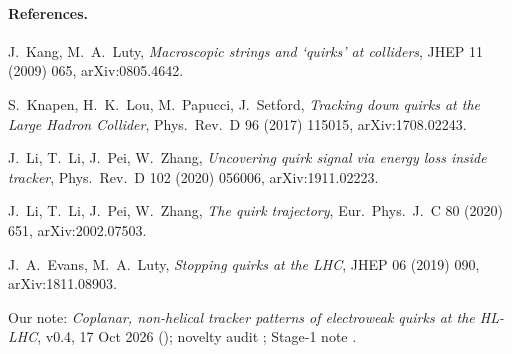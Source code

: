 \documentclass[11pt]{article}
\begin{document}
\paragraph{References.}
{\small
\begin{enumerate}[label={[\arabic*]},leftmargin=*]
\item J.~Kang, M.~A.~Luty, \emph{Macroscopic strings and `quirks' at colliders}, JHEP 11 (2009) 065, arXiv:0805.4642.
\item S.~Knapen, H.~K.~Lou, M.~Papucci, J.~Setford, \emph{Tracking down quirks at the Large Hadron Collider}, Phys.\ Rev.\ D 96 (2017) 115015, arXiv:1708.02243.
\item J.~Li, T.~Li, J.~Pei, W.~Zhang, \emph{Uncovering quirk signal via energy loss inside tracker}, Phys.\ Rev.\ D 102 (2020) 056006, arXiv:1911.02223.
\item J.~Li, T.~Li, J.~Pei, W.~Zhang, \emph{The quirk trajectory}, Eur.\ Phys.\ J.\ C 80 (2020) 651, arXiv:2002.07503.
\item J.~A.~Evans, M.~A.~Luty, \emph{Stopping quirks at the LHC}, JHEP 06 (2019) 090, arXiv:1811.08903.
\item Our note: \emph{Coplanar, non-helical tracker patterns of electroweak quirks at the HL-LHC}, v0.4, 17 Oct 2026 (); novelty audit ; Stage-1 note .
\end{enumerate}}
\end{document}
